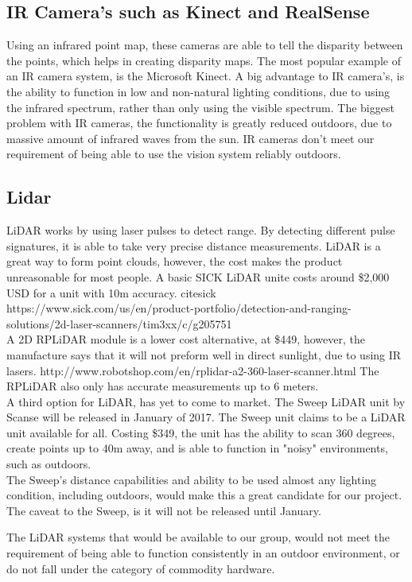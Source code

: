 \documentclass[compsoc,draftclsnofoot,onecolumn,10pt]{IEEEtran}
\begin{document}
\subsection{IR Camera's such as Kinect and RealSense}
Using an infrared point map, these cameras are able to tell the disparity between the points, which helps in creating disparity maps. The most popular example of an IR camera system, is the Microsoft Kinect. 
A big advantage to IR camera's, is the ability to function in low and non-natural lighting conditions, due to using the infrared spectrum, rather than only using the visible spectrum. 
The biggest problem with IR cameras, the functionality is greatly reduced outdoors, due to massive amount of infrared waves from the sun. 
IR cameras don't meet our requirement of being able to use the vision system reliably outdoors.

\subsection{Lidar}
LiDAR works by using laser pulses to detect range. 
By detecting different pulse signatures, it is able to take very precise distance measurements. 
LiDAR is a great way to form point clouds, however, the cost makes the product unreasonable for most people. 
A basic SICK LiDAR unite costs around \$2,000 USD for a unit with 10m accuracy. cite{sick} https://www.sick.com/us/en/product-portfolio/detection-and-ranging-solutions/2d-laser-scanners/tim3xx/c/g205751\\
A 2D RPLiDAR module is a lower cost alternative, at \$449, however, the manufacture says that it will not preform well in direct sunlight, due to using IR lasers. http://www.robotshop.com/en/rplidar-a2-360-laser-scanner.html
The RPLiDAR also only has accurate measurements up to 6 meters.\\
A third option for LiDAR, has yet to come to market. 
The Sweep LiDAR unit by Scanse will be released in January of 2017. 
The Sweep unit claims to be a LiDAR unit available for all.
Costing \$349, the unit has the ability to scan 360 degrees, create points up to 40m away, and is able to function in "noisy" environments, such as outdoors. \\
The Sweep's distance capabilities and ability to be used almost any lighting condition, including outdoors, would make this a great candidate for our project.
The caveat to the Sweep, is it will not be released until January. \par
The LiDAR systems that would be available to our group, would not meet the requirement of being able to function consistently in an outdoor environment, or do not fall under the category of commodity hardware. 
\end{document}
